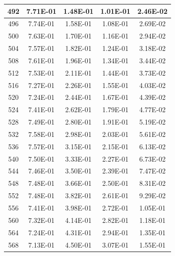 \begin{longtable}{c||c|c|c|c}
        492 & 7.71E-01 & 1.48E-01 & 1.01E-01 & 2.46E-02 \\ \hline
        496 & 7.74E-01 & 1.58E-01 & 1.08E-01 & 2.69E-02 \\ \hline
        500 & 7.63E-01 & 1.70E-01 & 1.16E-01 & 2.94E-02 \\ \hline
        504 & 7.57E-01 & 1.82E-01 & 1.24E-01 & 3.18E-02 \\ \hline
        508 & 7.61E-01 & 1.96E-01 & 1.34E-01 & 3.44E-02 \\ \hline
        512 & 7.53E-01 & 2.11E-01 & 1.44E-01 & 3.73E-02 \\ \hline
        516 & 7.27E-01 & 2.26E-01 & 1.55E-01 & 4.03E-02 \\ \hline
        520 & 7.24E-01 & 2.44E-01 & 1.67E-01 & 4.39E-02 \\ \hline
        524 & 7.41E-01 & 2.62E-01 & 1.79E-01 & 4.77E-02 \\ \hline
        528 & 7.49E-01 & 2.80E-01 & 1.91E-01 & 5.19E-02 \\ \hline
        532 & 7.58E-01 & 2.98E-01 & 2.03E-01 & 5.61E-02 \\ \hline
        536 & 7.57E-01 & 3.15E-01 & 2.15E-01 & 6.13E-02 \\ \hline
        540 & 7.50E-01 & 3.33E-01 & 2.27E-01 & 6.73E-02 \\ \hline
        544 & 7.46E-01 & 3.50E-01 & 2.39E-01 & 7.47E-02 \\ \hline
        548 & 7.48E-01 & 3.66E-01 & 2.50E-01 & 8.31E-02 \\ \hline
        552 & 7.48E-01 & 3.82E-01 & 2.61E-01 & 9.29E-02 \\ \hline
        556 & 7.41E-01 & 3.98E-01 & 2.72E-01 & 1.05E-01 \\ \hline
        560 & 7.32E-01 & 4.14E-01 & 2.82E-01 & 1.18E-01 \\ \hline
        564 & 7.24E-01 & 4.31E-01 & 2.94E-01 & 1.35E-01 \\ \hline
        568 & 7.13E-01 & 4.50E-01 & 3.07E-01 & 1.55E-01 \\ \hline

\end{longtable}
